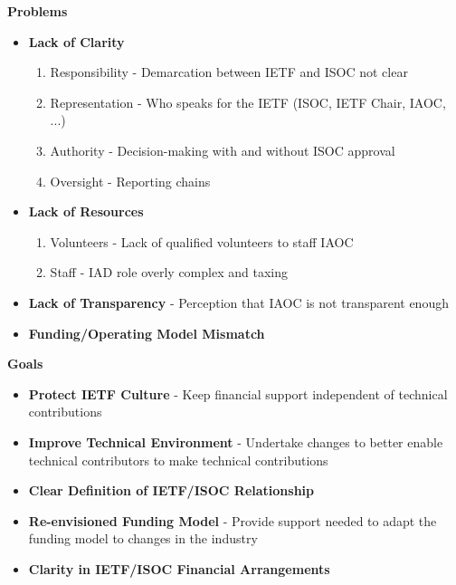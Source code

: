 \documentclass[helvetica,a4paper,landscape]{seminar}
\newcommand{\heading}[1]{%
  \begin{center} 
    \large\bf 
    #1 
  \end{center} 
  \vspace{.4 in}}
\begin{document}
\begin{slide}

\heading{Problems}

{\footnotesize
\begin{itemize}
\item \textbf{Lack of Clarity}
   \begin{enumerate}
      \item Responsibility - Demarcation between IETF and ISOC not clear
      \item Representation - Who speaks for the IETF (ISOC, IETF Chair, IAOC, ...)
      \item Authority - Decision-making with and without ISOC approval
      \item Oversight - Reporting chains
   \end{enumerate}
\item \textbf{Lack of Resources}
   \begin{enumerate}
      \item Volunteers - Lack of qualified volunteers to staff IAOC
      \item Staff - IAD role overly complex and taxing
   \end{enumerate}
\item \textbf{Lack of Transparency} - Perception that IAOC is not transparent enough
\item \textbf{Funding/Operating Model Mismatch}
\end{itemize}
}

\end{slide}

\begin{slide}

\heading{Goals}

{\footnotesize
\begin{itemize}
\item \textbf{Protect IETF Culture} - Keep financial support independent of technical contributions
\item \textbf{Improve Technical Environment} - Undertake changes to better enable technical contributors to make technical contributions
\item \textbf{Clear Definition of IETF/ISOC Relationship}
\item \textbf{Re-envisioned Funding Model} - Provide support needed to adapt the funding model to changes in the industry
\item \textbf{Clarity in IETF/ISOC Financial Arrangements}
\end{itemize}
}

\end{slide}
\end{document}
